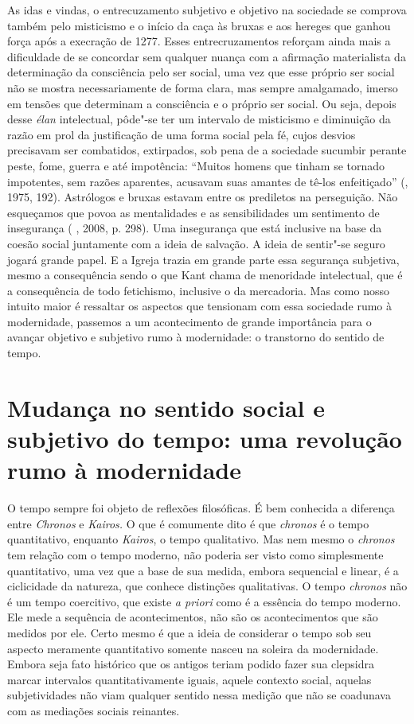 As idas e vindas, o entrecuzamento subjetivo e objetivo na sociedade se
comprova também pelo misticismo e o início da caça às bruxas e aos
hereges que ganhou força após a execração de 1277. Esses entrecruzamentos
reforçam ainda mais a dificuldade de se concordar sem qualquer nuança com a
afirmação materialista da determinação da consciência pelo ser social,
uma vez que esse próprio ser social não se mostra necessariamente de
forma clara, mas sempre amalgamado, imerso em tensões que determinam a
consciência e o próprio ser social. Ou seja, depois desse \emph{élan}
intelectual, pôde"-se ter um intervalo de misticismo e diminuição da
razão em prol da justificação de uma forma social pela fé, cujos desvios
precisavam ser combatidos, extirpados, sob pena de a sociedade sucumbir
perante peste, fome, guerra e até impotência: ``Muitos homens que tinham
se tornado impotentes, sem razões aparentes, acusavam suas amantes de
tê-los enfeitiçado'' (, 1975, 192). Astrólogos e bruxas estavam
entre os prediletos na perseguição. Não esqueçamos que povoa as
mentalidades e as sensibilidades um sentimento de insegurança ( ,
2008, p. 298). Uma insegurança que está inclusive na base da coesão
social juntamente com a ideia de salvação. A ideia de sentir"-se seguro
jogará grande papel. E a Igreja trazia em grande parte essa segurança
subjetiva, mesmo a consequência sendo o que Kant chama de menoridade
intelectual, que é a consequência de todo fetichismo, inclusive o da
mercadoria. Mas como nosso intuito maior é ressaltar os aspectos que
tensionam com essa sociedade rumo à modernidade, passemos a um
acontecimento de grande importância para o avançar objetivo e subjetivo
rumo à modernidade: o transtorno do sentido de tempo.

\section{Mudança no sentido social e subjetivo do tempo: uma revolução rumo à modernidade}

O tempo sempre foi objeto de reflexões filosóficas. É bem conhecida a
diferença entre \emph{Chronos} e \emph{Kairos.} O que é comumente dito é
que \emph{chronos} é o tempo quantitativo, enquanto \emph{Kairos}, o
tempo qualitativo. Mas nem mesmo o \emph{chronos} tem relação com o
tempo moderno, não poderia ser visto como simplesmente quantitativo, uma
vez que a base de sua medida, embora sequencial e linear, é a
ciclicidade da natureza, que conhece distinções qualitativas. O tempo
\emph{chronos} não é um tempo coercitivo, que existe \emph{a priori}
como é a essência do tempo moderno. Ele mede a sequência de
acontecimentos, não são os acontecimentos que são medidos por ele. Certo
mesmo é que a ideia de considerar o tempo sob seu aspecto meramente
quantitativo somente nasceu na soleira da modernidade. Embora seja fato
histórico que os antigos teriam podido fazer sua clepsidra marcar
intervalos quantitativamente iguais, aquele contexto social, aquelas
subjetividades não viam qualquer sentido nessa medição que não se
coadunava com as mediações sociais reinantes.

